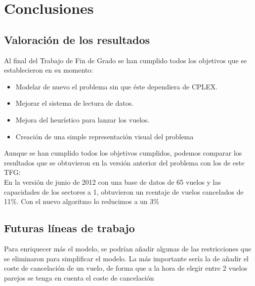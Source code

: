 \chapter{Conclusiones}
\label{conclusiones}
\section{Valoración de los resultados}
Al final del Trabajo de Fin de Grado se han cumplido todos los objetivos que se establecieron en su momento:
\begin{itemize}
	\item Modelar de nuevo el problema sin que éste dependiera de CPLEX.
	\item Mejorar el sistema de lectura de datos.
	\item Mejora del heurístico para lanzar los vuelos.
	\item Creación de una simple representación visual del problema
\end{itemize}
Aunque se han cumplido todos los objetivos cumplidos, podemos comparar los resultados que se obtuvieron en la versión anterior del problema con los de este TFG:\\
En la versión de junio de 2012 con una base de datos de 65 vuelos y las capacidades de los sectores a 1, obtuvieron un rcentaje de vuelos cancelados de 11\%. Con el nuevo algoritmo lo reducimos a un 3\%
\section{Futuras líneas de trabajo}
Para enriquecer más el modelo, se podrían añadir algunas de las restricciones que se eliminaron para simplificar el modelo. La más importante sería la de añadir el coste de cancelación de un vuelo, de forma que a la hora de elegir entre 2 vuelos parejos se tenga en cuenta el coste de cancelación


